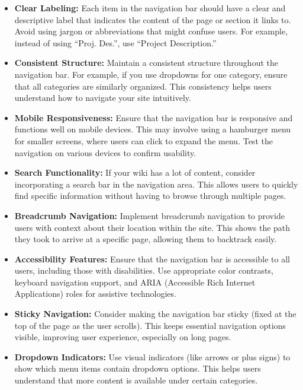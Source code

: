 \begin{itemize}
    \item \textbf{Clear Labeling:}
    Each item in the navigation bar should have a clear and descriptive label that indicates the content of the page or section it links to.
    Avoid using jargon or abbreviations that might confuse users.
    For example, instead of using ``Proj.
    Des.'', use ``Project Description.''

    \item \textbf{Consistent Structure:}
    Maintain a consistent structure throughout the navigation bar.
    For example, if you use dropdowns for one category, ensure that all categories are similarly organized.
    This consistency helps users understand how to navigate your site intuitively.

    \item \textbf{Mobile Responsiveness:}
    Ensure that the navigation bar is responsive and functions well on mobile devices.
    This may involve using a hamburger menu for smaller screens, where users can click to expand the menu.
    Test the navigation on various devices to confirm usability.

    \item \textbf{Search Functionality:}
    If your wiki has a lot of content, consider incorporating a search bar in the navigation area.
    This allows users to quickly find specific information without having to browse through multiple pages.

    \item \textbf{Breadcrumb Navigation:}
    Implement breadcrumb navigation to provide users with context about their location within the site.
    This shows the path they took to arrive at a specific page, allowing them to backtrack easily.

    \item \textbf{Accessibility Features:}
    Ensure that the navigation bar is accessible to all users, including those with disabilities.
    Use appropriate color contrasts, keyboard navigation support, and ARIA (Accessible Rich Internet Applications) roles for assistive technologies.

    \item \textbf{Sticky Navigation:}
    Consider making the navigation bar sticky (fixed at the top of the page as the user scrolls).
    This keeps essential navigation options visible, improving user experience, especially on long pages.

    \item \textbf{Dropdown Indicators:}
    Use visual indicators (like arrows or plus signs) to show which menu items contain dropdown options.
    This helps users understand that more content is available under certain categories.


\end{itemize}
